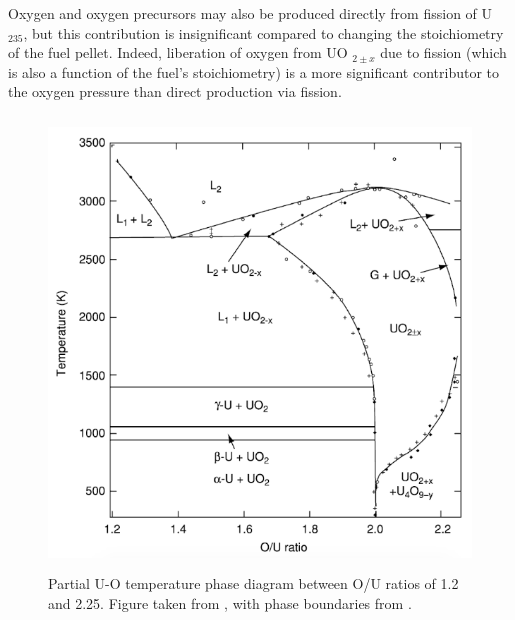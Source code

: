 Oxygen and oxygen precursors may also be produced directly from fission of U
$_{235}$, but this contribution is insignificant compared to changing the stoichiometry of the fuel pellet. Indeed, liberation of oxygen from UO
$_{2 \pm x}$ due to fission (which is also a function of the fuel's stoichiometry) is a more significant contributor to the oxygen pressure than direct production via fission.

\begin{figure}[htp]
\centering
\includegraphics[height=12cm]{images/UO_phase_diagram.png}
\caption[Partial U-O temperature phase diagram between O/U ratios of 1.2 and 2.25.]{Partial U-O temperature phase diagram between O/U ratios of 1.2 and 2.25. Figure taken from \cite{katz2007chemistry}, with phase boundaries from \cite{rand1978thermodynamic, chevalier2002progress, gueneau2002thermodynamic}.}
\label{figure:U_O_phase_diagram}
\end{figure}


